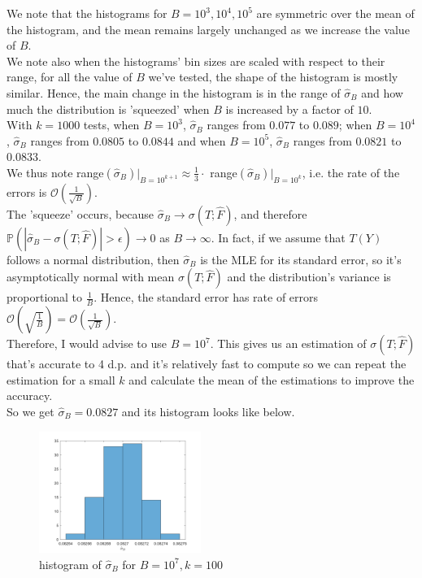 \documentclass[10pt]{article}
\begin{document}
\noindent We note that the histograms for $B=10^3,10^4,10^5$ are symmetric over the mean of the histogram, and the mean remains largely unchanged as we increase the value of $B$.\\
We note also when the histograms' bin sizes are scaled with respect to their range, for all the value of $B$ we've tested, the shape of the histogram is mostly similar. Hence, the main change in the histogram is in the range of $\hat{\sigma}_B$ and how much the distribution is 'squeezed' when $B$ is increased by a factor of $10$.\\
With $k=1000$ tests, when $B=10^3$, $\hat{\sigma}_B$ ranges from $0.077$ to $0.089$; when $B=10^4$, $\hat{\sigma}_B$ ranges from $0.0805$ to $0.0844$ and when $B=10^5$, $\hat{\sigma}_B$ ranges from $0.0821$ to $0.0833$. \\
We thus note range$(\hat{\sigma}_B)|_{B=10^{k+1}}\approx\frac{1}{3}\cdot$ range$(\hat{\sigma}_B)|_{B=10^{k}}$, i.e. the rate of the errors is $\mathcal{O}(\frac{1}{\sqrt{B}})$.\\
The 'squeeze' occurs, because $\hat{\sigma}_B\to\sigma(T;\hat{F})$, and therefore $\mathds{P}(|\hat{\sigma}_B-\sigma(T;\hat{F})|> \epsilon)\to0$ as $B\to\infty$. In fact, if we assume that $T(Y)$ follows a normal distribution, then $\hat{\sigma}_B$ is the MLE for its standard error, so it's asymptotically normal with mean $\sigma(T;\hat{F})$ and the distribution's variance is proportional to $\frac{1}{B}$. Hence, the standard error has rate of errors $\mathcal{O}(\sqrt{\frac{1}{B}})=\mathcal{O}(\frac{1}{\sqrt{B}})$.\\
Therefore, I would advise to use $B=10^7$. This gives us an estimation of $\sigma(T;\hat{F})$ that's accurate to 4 d.p. and it's relatively fast to compute so we can repeat the estimation for a small $k$ and calculate the mean of the estimations to improve the accuracy.\\
So we get \underline{$\hat{\sigma}_B=0.0827$} and its histogram looks like below.
\begin{figure}[H]
\centering
\includegraphics[width=0.47\textwidth]{files/q3,b=10^7.png}
\caption{histogram of $\hat{\sigma}_B$ for $B=10^7,k=100$}
\end{figure}
\end{document}
